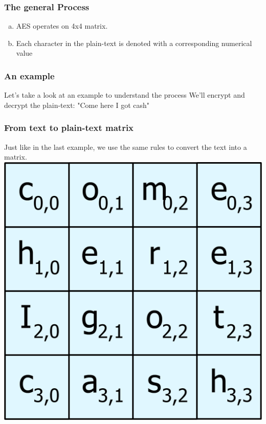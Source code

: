 \documentclass[11pt]{beamer}
\begin{document}
\begin{frame}\frametitle{The general Process}
	\begin{enumerate}[a.]
	\item AES operates on 4x4 matrix.
	\item Each character in the plain-text is denoted with a corresponding numerical value
	\end{enumerate}
\end{frame}

\begin{frame}\frametitle{An example}
\center Let's take a look at an example to understand the process
\center We'll encrypt and decrypt the plain-text:
\center "Come here I got cash"

\end{frame}

\begin{frame}\frametitle{From text to plain-text matrix}
	Just like in the last example, we use the same rules to convert the text into a matrix. 
	\center \includegraphics[scale=0.3]{initial_matrix_1}

\end{frame}
\end{document}
